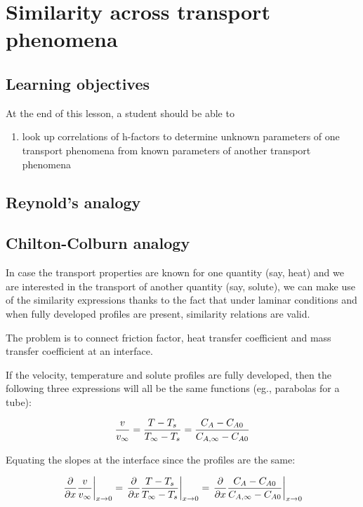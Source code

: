 \chapter{Similarity across transport phenomena}

\section{Learning objectives}

At the end of this lesson, a student should be able to 

\begin{enumerate}
\item look up correlations of h-factors to determine unknown parameters of one transport phenomena from known parameters of another transport phenomena
\end{enumerate}


\section{Reynold's analogy}


\section{Chilton-Colburn analogy}

In case the transport properties are known for one quantity (say, heat) and we
are interested in the transport of another quantity (say, solute), we can make
use of the similarity expressions thanks to the fact that under laminar
conditions and when fully developed profiles are present, similarity relations
are valid.

The problem is to connect friction factor, heat transfer coefficient and mass
transfer coefficient at an interface. 

If the velocity, temperature and solute profiles are fully developed, then the
following three expressions will all be the same functions (eg., parabolas for a
tube):

$$ {v \over v_\infty} = {T - T_s \over T_\infty - T_s} = {C_A - C_{A0} \over
C_{A,\infty} - C_{A0}} $$

Equating the slopes at the interface since the profiles are the same:

$$ \left. {\partial \over \partial x} {v \over v_\infty} \right|_{x \rightarrow
0} = \left. {\partial \over \partial x} {T - T_s \over T_\infty - T_s}\right|_{x
\rightarrow 0} = \left. {\partial \over \partial x} {C_A - C_{A0} \over
C_{A,\infty} - C_{A0}}\right|_{x \rightarrow 0} $$


